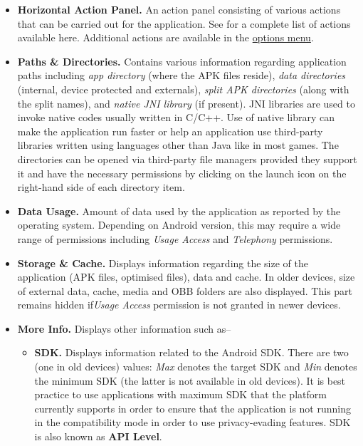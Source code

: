 \begin{itemize}
    \item \textbf{Horizontal Action Panel.} An action panel consisting of various actions that can be carried out for
    the application. See  for a complete list of actions available here.
    Additional actions are available in the \hyperref[subsubsec:app-info-options-menu]{options menu}.

    \item \textbf{Paths \& Directories.} Contains various information regarding application paths including \textit{app
    directory} (where the APK files reside), \textit{data directories} (internal, device protected and externals),
    \textit{split APK directories} (along with the split names), and \textit{native JNI library} (if present). JNI
    libraries are used to invoke native codes usually written in C/C++. Use of native library can make the application
    run faster or help an application use third-party libraries written using languages other than Java like in most
    games. The directories can be opened via third-party file managers provided they support it and have the necessary
    permissions by clicking on the launch icon on the right-hand side of each directory item.

    \item \textbf{Data Usage.} Amount of data used by the application as reported by the operating system. Depending on
    Android version, this may require a wide range of permissions including \textit{Usage Access} and \textit{Telephony}
    permissions.

    \item \textbf{Storage \& Cache.} Displays information regarding the size of the application (APK files, optimised
    files), data and cache. In older devices, size of external data, cache, media and OBB folders are also displayed.
    This part remains hidden if\textit{Usage Access} permission is not granted in newer devices.

    \item \textbf{More Info.} Displays other information such as--
    \begin{itemize}
        \item \textbf{SDK.} Displays information related to the Android SDK. There are two (one in old devices) values:
        \textit{Max} denotes the target SDK and \textit{Min} denotes the minimum SDK (the latter is not available in old
        devices). It is best practice to use applications with maximum SDK that the platform currently supports in order
        to ensure that the application is not running in the compatibility mode in order to use privacy-evading features.
        SDK is also known as \textbf{API Level}.


\end{itemize}
\end{itemize}
